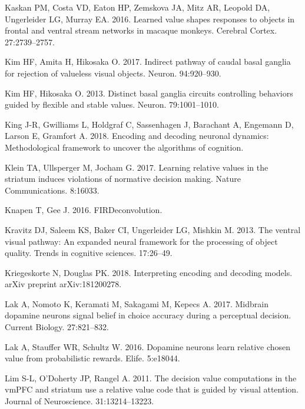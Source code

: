 \documentclass[]{article}
\begin{document}
\leavevmode\hypertarget{ref-Kaskanetal2016}{}%
Kaskan PM, Costa VD, Eaton HP, Zemskova JA, Mitz AR, Leopold DA,
Ungerleider LG, Murray EA. 2016. Learned value shapes responses to
objects in frontal and ventral stream networks in macaque monkeys.
Cerebral Cortex. 27:2739--2757.

\leavevmode\hypertarget{ref-Kimetal2017}{}%
Kim HF, Amita H, Hikosaka O. 2017. Indirect pathway of caudal basal
ganglia for rejection of valueless visual objects. Neuron. 94:920--930.

\leavevmode\hypertarget{ref-KimHikosaka2013}{}%
Kim HF, Hikosaka O. 2013. Distinct basal ganglia circuits controlling
behaviors guided by flexible and stable values. Neuron. 79:1001--1010.

\leavevmode\hypertarget{ref-Kingetal2018}{}%
King J-R, Gwilliams L, Holdgraf C, Sassenhagen J, Barachant A, Engemann
D, Larson E, Gramfort A. 2018. Encoding and decoding neuronal dynamics:
Methodological framework to uncover the algorithms of cognition.

\leavevmode\hypertarget{ref-Kleinetal2017}{}%
Klein TA, Ullsperger M, Jocham G. 2017. Learning relative values in the
striatum induces violations of normative decision making. Nature
Communications. 8:16033.

\leavevmode\hypertarget{ref-KnapenGee2016}{}%
Knapen T, Gee J. 2016. FIRDeconvolution.

\leavevmode\hypertarget{ref-Kravitzetal2013}{}%
Kravitz DJ, Saleem KS, Baker CI, Ungerleider LG, Mishkin M. 2013. The
ventral visual pathway: An expanded neural framework for the processing
of object quality. Trends in cognitive sciences. 17:26--49.

\leavevmode\hypertarget{ref-KriegeskorteDouglas2018}{}%
Kriegeskorte N, Douglas PK. 2018. Interpreting encoding and decoding
models. arXiv preprint arXiv:181200278.

\leavevmode\hypertarget{ref-Laketal2017}{}%
Lak A, Nomoto K, Keramati M, Sakagami M, Kepecs A. 2017. Midbrain
dopamine neurons signal belief in choice accuracy during a perceptual
decision. Current Biology. 27:821--832.

\leavevmode\hypertarget{ref-Laketal2016}{}%
Lak A, Stauffer WR, Schultz W. 2016. Dopamine neurons learn relative
chosen value from probabilistic rewards. Elife. 5:e18044.

\leavevmode\hypertarget{ref-Limetal2011}{}%
Lim S-L, O'Doherty JP, Rangel A. 2011. The decision value computations
in the vmPFC and striatum use a relative value code that is guided by
visual attention. Journal of Neuroscience. 31:13214--13223.
\end{document}
